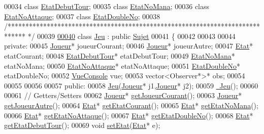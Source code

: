 \begin{DoxyCode}
00034 \textcolor{keyword}{class }\hyperlink{class_etat_debut_tour}{EtatDebutTour};
00035 \textcolor{keyword}{class }\hyperlink{class_etat_no_mana}{EtatNoMana};
00036 \textcolor{keyword}{class }\hyperlink{class_etat_no_attaque}{EtatNoAttaque};
00037 \textcolor{keyword}{class }\hyperlink{class_etat_double_no}{EtatDoubleNo};
00038 \textcolor{comment}{/*****************************************************************************
      */}
00039 
\hypertarget{_jeu_8hpp_source_l00040}{}\hyperlink{class_jeu}{00040} \textcolor{keyword}{class }\hyperlink{class_jeu}{Jeu} : \textcolor{keyword}{public} \hyperlink{class_sujet}{Sujet}
00041 \{
00042 
00043 
00044     \textcolor{keyword}{private}:
00045         \hyperlink{class_joueur}{Joueur}* joueurCourant;
00046         \hyperlink{class_joueur}{Joueur}* joueurAutre;
00047         \hyperlink{class_etat}{Etat}* etatCourant;
00048         \hyperlink{class_etat_debut_tour}{EtatDebutTour}* etatDebutTour;
00049         \hyperlink{class_etat_no_mana}{EtatNoMana}* etatNoMana;
00050         \hyperlink{class_etat_no_attaque}{EtatNoAttaque}* etatNoAttaque;
00051         \hyperlink{class_etat_double_no}{EtatDoubleNo}* etatDoubleNo;
00052         \hyperlink{class_vue_console}{VueConsole} vue;
00053         vector<Observer*>* obs;     
00054 
00055  
00056     
00057     \textcolor{keyword}{public}:
00058         \hyperlink{class_jeu_a3033d02a2ec0e17b170b0735393d716e}{Jeu}(\hyperlink{class_joueur}{Joueur}* j1,\hyperlink{class_joueur}{Joueur}* j2);
00059         \hyperlink{class_jeu_a9cd19e73df169d7f09397be61ba8548c}{~Jeu}();
00060         
00061         \textcolor{comment}{// Getters/Setters}
00062         \hyperlink{class_joueur}{Joueur}* \hyperlink{class_jeu_a676f11e6bda0cde27f128e90cbaae765}{getJoueurCourant}();
00063         \hyperlink{class_joueur}{Joueur}* \hyperlink{class_jeu_aeaa0f199d6a1c9271a49b226159dd1ca}{getJoueurAutre}();
00064         \hyperlink{class_etat}{Etat}* \hyperlink{class_jeu_a6a84bec16f8075c1c9b867096dfc2b06}{getEtatCourant}();
00065         \hyperlink{class_etat}{Etat}* \hyperlink{class_jeu_a6af6b2d0bd215cde1d63dbe3e799b291}{getEtatNoMana}();
00066         \hyperlink{class_etat}{Etat}* \hyperlink{class_jeu_a4935a721a0e230cebae3905c78f3721f}{getEtatNoAttaque}();
00067         \hyperlink{class_etat}{Etat}* \hyperlink{class_jeu_a94fc4b05a1d532795b4c8a5d0fec4003}{getEtatDoubleNo}();
00068         \hyperlink{class_etat}{Etat}* \hyperlink{class_jeu_a8ae205a6a9d95ec5bed20e2fdf5c74a7}{getEtatDebutTour}();
00069         \textcolor{keywordtype}{void} \hyperlink{class_jeu_a0e5e13b72cd123ac0afef1fa001c9d5f}{setEtat}(\hyperlink{class_etat}{Etat}* e); 

\end{DoxyCode}
